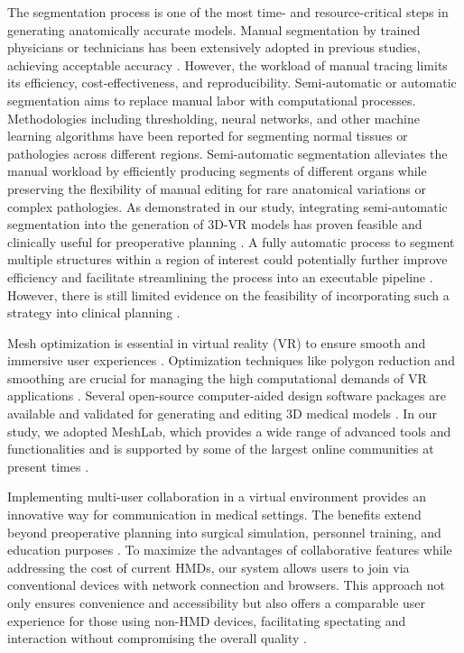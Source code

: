 \documentclass{bmcart}
\begin{document}
The segmentation process is one of the most time- and resource-critical steps in generating anatomically accurate models. Manual segmentation by trained physicians or technicians has been extensively adopted in previous studies, achieving acceptable accuracy \cite{RN17, RN48, RN49}. However, the workload of manual tracing limits its efficiency, cost-effectiveness, and reproducibility. Semi-automatic or automatic segmentation aims to replace manual labor with computational processes. Methodologies including thresholding, neural networks, and other machine learning algorithms have been reported for segmenting normal tissues \cite{RN50} or pathologies \cite{RN52, RN54, RN55} across different regions. Semi-automatic segmentation alleviates the manual workload by efficiently producing segments of different organs while preserving the flexibility of manual editing for rare anatomical variations or complex pathologies. As demonstrated in our study, integrating semi-automatic segmentation into the generation of 3D-VR models has proven feasible and clinically useful for preoperative planning \cite{RN10, RN23}. A fully automatic process to segment multiple structures within a region of interest could potentially further improve efficiency and facilitate streamlining the process into an executable pipeline \cite{RN51, RN57, RN56}. However, there is still limited evidence on the feasibility of incorporating such a strategy into clinical planning \cite{RN9}.

Mesh optimization is essential in virtual reality (VR) to ensure smooth and immersive user experiences \cite{RN58}. Optimization techniques like polygon reduction and smoothing are crucial for managing the high computational demands of VR applications \cite{RN58, RN59}. Several open-source computer-aided design software packages are available and validated for generating and editing 3D medical models \cite{RN60, RN5}. In our study, we adopted MeshLab, which provides a wide range of advanced tools and functionalities and is supported by some of the largest online communities at present times \cite{RN61}.

Implementing multi-user collaboration in a virtual environment provides an innovative way for communication in medical settings. The benefits extend beyond preoperative planning into surgical simulation, personnel training, and education purposes \cite{RN64, RN26, RN65}. To maximize the advantages of collaborative features while addressing the cost of current HMDs, our system allows users to join via conventional devices with network connection and browsers. This approach not only ensures convenience and accessibility but also offers a comparable user experience for those using non-HMD devices, facilitating spectating and interaction without compromising the overall quality \cite{RN63}.
\end{document}
